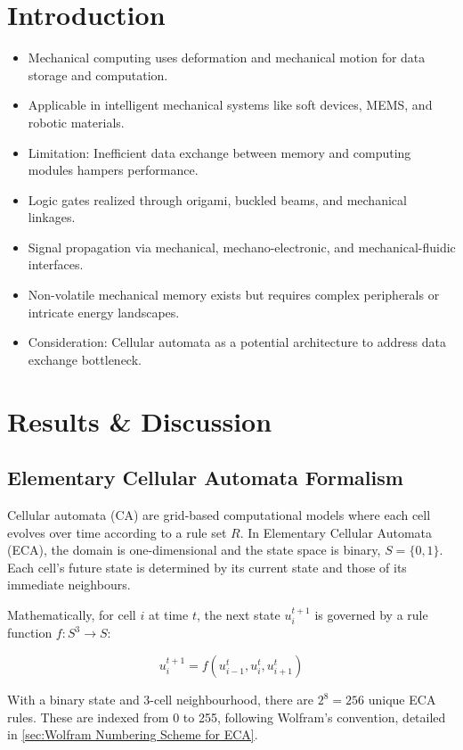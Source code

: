 \section{Introduction}
\label{sec:introduction}
\begin{itemize}
    \item Mechanical computing uses deformation and mechanical motion for data storage and computation.
    \item Applicable in intelligent mechanical systems like soft devices, MEMS, and robotic materials.
    \item Limitation: Inefficient data exchange between memory and computing modules hampers performance.
    \item Logic gates realized through origami, buckled beams, and mechanical linkages.
    \item Signal propagation via mechanical, mechano-electronic, and mechanical-fluidic interfaces.
    \item Non-volatile mechanical memory exists but requires complex peripherals or intricate energy landscapes.
    \item Consideration: Cellular automata as a potential architecture to address data exchange bottleneck.
\end{itemize}
\section{Results \& Discussion}

\subsection*{Elementary Cellular Automata Formalism}
Cellular automata (CA) are grid-based computational models where each cell evolves over time according to a rule set \( R \). In Elementary Cellular Automata (ECA), the domain is one-dimensional and the state space is binary, \( S = \{0, 1\} \). Each cell's future state is determined by its current state and those of its immediate neighbours.

Mathematically, for cell \( i \) at time \( t \), the next state \( u_i^{t+1} \) is governed by a rule function \( f: S^3 \to S \):

\[
u_i^{t+1} = f(u_{i-1}^t, u_i^t, u_{i+1}^t)
\]

With a binary state and 3-cell neighbourhood, there are \( 2^8 = 256 \) unique ECA rules. These are indexed from 0 to 255, following Wolfram's convention, detailed in \autoref*{sec:Wolfram Numbering Scheme for ECA}.

